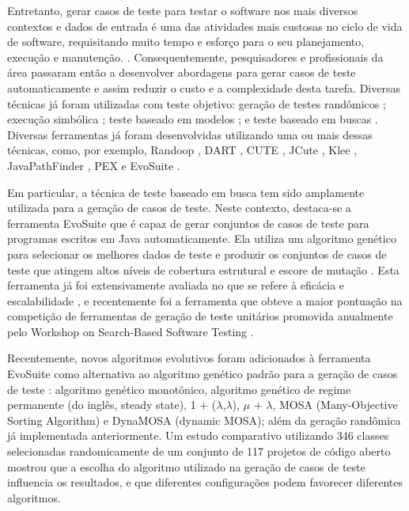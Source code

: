 \documentclass[
	12pt,				%
	oneside,			%
	a4paper,			%
	english,			%
	brazil				%
	]{abntex2ppgsi}
\begin{document}
Entretanto, gerar casos de teste para testar o software nos mais diversos contextos e dados de entrada é uma das atividades mais custosas no ciclo de vida de software, requisitando muito tempo e esforço para o seu planejamento, execução e manutenção. \cite{tahir2014test}. Consequentemente, pesquisadores e profissionais da área passaram então a desenvolver  abordagens para gerar casos de teste automaticamente e assim reduzir o custo e a complexidade desta tarefa. Diversas técnicas já foram utilizadas com teste objetivo: geração de testes randômicos \cite{Pacheco2007}; execução simbólica \cite{Cadar2013}; teste baseado em modelos \cite{dick93}; e teste baseado em buscas \cite{McMinn2004, Harman2012}. Diversas ferramentas já foram desenvolvidas utilizando uma ou mais dessas técnicas, como, por exemplo, Randoop \cite{Pacheco2007}, DART \cite{Godefroid2005}, CUTE \cite{Sen2005}, JCute \cite{Sen2006}, Klee \cite{Cadar2008}, JavaPathFinder \cite{Visser2004}, PEX \cite{Tillmann2008} e EvoSuite \cite{Fraser2011}.

Em particular, a técnica de teste baseado em busca tem sido amplamente utilizada para a geração de casos de teste. Neste contexto, destaca-se a ferramenta EvoSuite que é capaz de gerar conjuntos de casos de teste para programas escritos em Java automaticamente. Ela utiliza um algoritmo genético para selecionar os melhores dados de teste e produzir os conjuntos de casos de teste que atingem altos níveis de cobertura estrutural e escore de mutação \cite{Fraser2011}. Esta ferramenta já foi extensivamente avaliada no que se refere à eficácia e escalabilidade \cite{Fraser2013, Rojas2017, Fraser2015, Fraser2014}, e recentemente foi a ferramenta que obteve a maior pontuação na competição de ferramentas de geração de teste unitários promovida anualmente pelo Workshop on Search-Based Software Testing \cite{Fraser2017}.

Recentemente, novos algoritmos evolutivos foram adicionados à ferramenta EvoSuite como alternativa ao algoritmo genético padrão para a geração de casos de teste \cite{Campos2017}:  algoritmo genético monotônico, algoritmo genético de regime permanente (do inglês, steady state), 1 + ($\lambda$,$\lambda$), $\mu$ + $\lambda$, MOSA (Many-Objective Sorting Algorithm) e DynaMOSA (dynamic MOSA); além da geração randômica já implementada anteriormente. Um estudo comparativo utilizando 346 classes selecionadas randomicamente de um conjunto de 117 projetos de código aberto mostrou que a escolha do algoritmo utilizado na geração de casos de teste influencia os resultados, e que diferentes configurações podem favorecer diferentes algoritmos.
\end{document}
